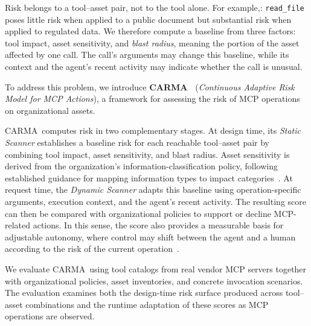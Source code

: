 \documentclass[sigconf]{acmart}
\newcommand{\frameworkname}{\textsc{CARMA}}
\begin{document}
Risk belongs to a tool--asset pair, not to the tool alone. For example,: \texttt{read\_file} poses little risk when applied to a public document but
substantial risk when applied to regulated data. We therefore compute a
baseline from three factors: tool impact, asset sensitivity, and
\emph{blast radius}, meaning the portion of the asset affected by one call.
The call's arguments may change this baseline, while its context and the
agent's recent activity may indicate whether the call is unusual.

To address this problem, we introduce \textbf{\frameworkname\ } (\textit{Continuous Adaptive Risk Model for MCP Actions}), a framework for assessing the risk of MCP operations on organizational assets.

\frameworkname\ computes risk in two complementary stages. At design time, its \textit{Static Scanner} establishes a baseline risk for each reachable tool--asset pair by combining tool impact, asset sensitivity, and blast radius. Asset sensitivity is derived from the organization's information-classification policy, following established guidance for mapping information types to impact categories~\cite{nist2004fips199,nist2008sp80060}. At request time, the \textit{Dynamic Scanner} adapts this baseline using operation-specific arguments, execution context, and the agent's recent activity. The resulting score can then be compared with organizational policies to support or decline MCP-related actions. In this sense, the score also provides a measurable basis for adjustable autonomy, where control may shift between the agent and a human according to the risk of the current operation~\cite{pynadath2002adjustable}.

We evaluate \frameworkname\ using tool catalogs from real vendor MCP servers together with organizational policies, asset inventories, and concrete invocation scenarios. The evaluation examines both the design-time risk surface produced across tool--asset combinations and the runtime adaptation of these scores as MCP operations are observed.
\end{document}
